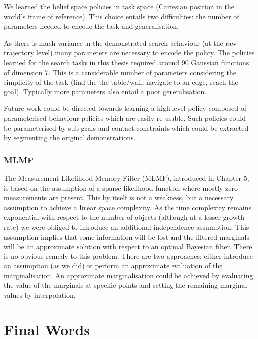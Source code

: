 We learned the belief space policies in task space (Cartesian position in the world's frame of reference). 
This choice entails two difficulties: the number of parameters needed to encode the task and 
generalisation.

As there is much variance in the demonstrated search behaviour (at the raw trajectory level) many parameters 
are necessary to encode the policy. The policies learned for the search tasks in this thesis required 
around 90 Gaussian functions of dimension 7. 
This is a considerable number of parameters considering the simplicity of the task (find the the table/wall, 
navigate to an edge, reach the goal). Typically more parameters also entail a poor generalisation. 

Future work could be directed towards learning a high-level policy composed of parameterised 
behaviour policies which are easily re-usable. Such policies could be parameterised by sub-goals 
and contact constraints which could be extracted by segmenting the original demonstrations.

\subsubsection{MLMF}
% 
%
The Measurement Likelihood Memory Filter (MLMF), introduced in Chapter 5, is based on 
the assumption of a sparse likelihood function where mostly zero measurements are present. 
This by itself is not a weakness, but a necessary assumption to achieve a linear space complexity. 
As the time complexity remains exponential with respect to the number of objects 
(although at a lesser growth rate) we were obliged to introduce an additional independence 
assumption. This assumption implies that some information will be lost and the filtered marginals will 
be an approximate solution with respect to an optimal Bayesian filter. There is no obvious remedy 
to this problem. There are two approaches: either introduce an assumption (as we did) or perform  
an approximate evaluation of the marginalisation. An approximate marginalisation could be achieved 
by evaluating the value of the marginals at specific points and setting the remaining marginal values by interpolation.

\section{Final Words}

